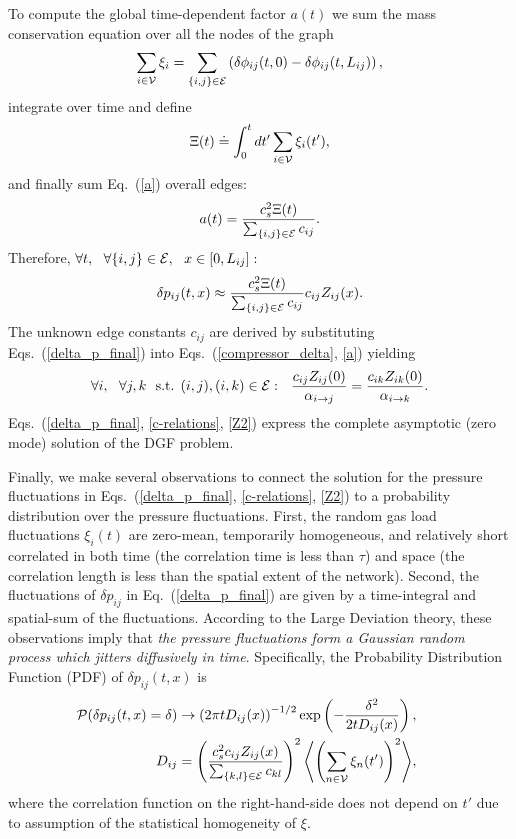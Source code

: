 \documentclass[10pt, conference, compsocconf]{IEEEtran}
\begin{document}
To compute the global time-dependent factor $a(t)$ we sum the mass conservation equation over all the nodes of the graph
\begin{equation}
\sum_{i\in{\cal V}}\xi_i=\sum_{\{i,j\}\in{\cal E}}\left(\delta\phi_{ij}(t,0)-\delta\phi_{ij}(t,L_{ij})\right),
\label{sum_delta_phi}
\end{equation}
integrate over time and define
\begin{equation}
\Xi(t)\doteq\int_0^tdt' \sum_{i\in{\cal V}}\xi_i(t'),\label{Xi}
\end{equation}
and finally sum Eq.~(\ref{a}) overall edges:
\begin{equation}
a(t)=\frac{c_s^2 \Xi(t)}{\sum_{\{i,j\}\in{\cal E}}c_{ij}}.
\label{aa}
\end{equation}
Therefore, $\forall t,\ \ \forall \{i,j\}\in{\cal E},\ \ x\in[0,L_{ij}]:$
\begin{equation}
\delta p_{ij}(t,x)\approx \frac{c_s^2\Xi(t)}{\sum_{\{i,j\}\in{\cal E}}c_{ij}} c_{ij}Z_{ij}(x).\label{delta_p_final}
\end{equation}
The unknown edge constants $c_{ij}$ are derived by substituting Eqs.~(\ref{delta_p_final}) into Eqs.~(\ref{compressor_delta}, \ref{a}) yielding
\begin{equation}
\forall i,\ \ \forall j,k\ \ \mbox{s.t.  }(i,j),(i,k)\in{\cal E}:\ \ \frac{c_{ij} Z_{ij}(0)}{\alpha_{i\to j}}=\frac{c_{ik}Z_{ik}(0)}{\alpha_{i\to k}}.
\label{c-relations}
\end{equation}
Eqs.~(\ref{delta_p_final}, \ref{c-relations}, \ref{Z2}) express the complete asymptotic (zero mode) solution of the DGF problem.

Finally, we make several observations to connect the solution for the pressure fluctuations in Eqs.~(\ref{delta_p_final}, \ref{c-relations}, \ref{Z2}) to a probability distribution over the pressure fluctuations.  First, the random gas load fluctuations $\xi_i(t)$ are zero-mean, temporarily homogeneous, and  relatively short correlated in both time (the correlation time is less than $\tau$) and space (the correlation length is less than the spatial extent of the network). Second, the fluctuations of $\delta p_{ij}$ in Eq.~(\ref{delta_p_final}) are given by a time-integral and spatial-sum of the fluctuations.  According to the Large Deviation theory, these observations imply that {\em the pressure fluctuations form a Gaussian random process which jitters diffusively in time}. Specifically, the Probability Distribution Function (PDF) of $\delta p_{ij}(t,x)$ is
\begin{eqnarray}
&& \hspace{-1cm}{\cal P}(\delta p_{ij}(t,x)=\delta)\to \left(2\pi t D_{ij}(x)\right)^{-1/2}
\exp\left(-\frac{\delta^2}{2 t D_{ij}(x)}\right),
\label{PDF}\\
&& \hspace{-1cm} D_{ij}=\left(\frac{c_s^2 c_{ij}Z_{ij}(x)}{\sum_{\{k,l\}\in{\cal E}}c_{kl}}\right)^2
\Biggl\langle \left(\sum_{n\in{\cal V}}\xi_n(t')\right)^2\Biggr\rangle
,\label{xi-xi}
\end{eqnarray}
where the correlation function on the right-hand-side does not depend on $t'$  due to assumption of the statistical homogeneity of $\xi$.
\end{document}
